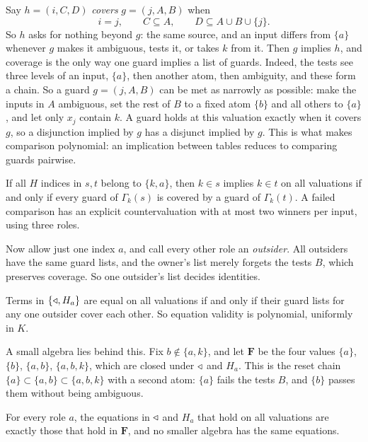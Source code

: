 Say $h=(i,C,D)$ \emph{covers} $g=(j,A,B)$ when
\begin{equation}\label{owner:eq:cover}
 i=j,\qquad C\subseteq A,\qquad D\subseteq A\cup B\cup\{j\}.
\end{equation}
So $h$ asks for nothing beyond $g$: the same source, and an input differs from $\{a\}$ whenever $g$ makes it ambiguous, tests it, or takes $k$ from it. Then $g$ implies $h$, and coverage is the only way one guard implies a list of guards. Indeed, the tests see three levels of an input, $\{a\}$, then another atom, then ambiguity, and these form a chain. So a guard $g=(j,A,B)$ can be met as narrowly as possible: make the inputs in $A$ ambiguous, set the rest of $B$ to a fixed atom $\{b\}$ and all others to $\{a\}$, and let only $x_j$ contain $k$. A guard holds at this valuation exactly when it covers $g$, so a disjunction implied by $g$ has a disjunct implied by $g$. This is what makes comparison polynomial: an implication between tables reduces to comparing guards pairwise.

\begin{proposition}\label{owner:thm:guards}
If all $H$ indices in $s,t$ belong to $\{k,a\}$, then $k\in s$ implies $k\in t$ on all valuations if and only if every guard of $\Gamma_k(s)$ is covered by a guard of $\Gamma_k(t)$. A failed comparison has an explicit countervaluation with at most two winners per input, using three roles.
\end{proposition}

Now allow just one index $a$, and call every other role an \emph{outsider}. All outsiders have the same guard lists, and the owner's list merely forgets the tests $B$, which preserves coverage. So one outsider's list decides identities.

\begin{theorem}\label{owner:thm:one-table}
Terms in $\{\mathbin{\triangleleft},H_a\}$ are equal on all valuations if and only if their guard lists for any one outsider cover each other. So equation validity is polynomial, uniformly in $K$.
\end{theorem}

A small algebra lies behind this. Fix $b\notin\{a,k\}$, and let $\mathbf F$ be the four values $\{a\}$, $\{b\}$, $\{a,b\}$, $\{a,b,k\}$, which are closed under $\mathbin{\triangleleft}$ and $H_a$. This is the reset chain $\{a\}\subset\{a,b\}\subset\{a,b,k\}$ with a second atom: $\{a\}$ fails the tests $B$, and $\{b\}$ passes them without being ambiguous.

\begin{theorem}\label{owner:thm:four}
For every role $a$, the equations in $\mathbin{\triangleleft}$ and $H_a$ that hold on all valuations are exactly those that hold in $\mathbf F$, and no smaller algebra has the same equations.
\end{theorem}

